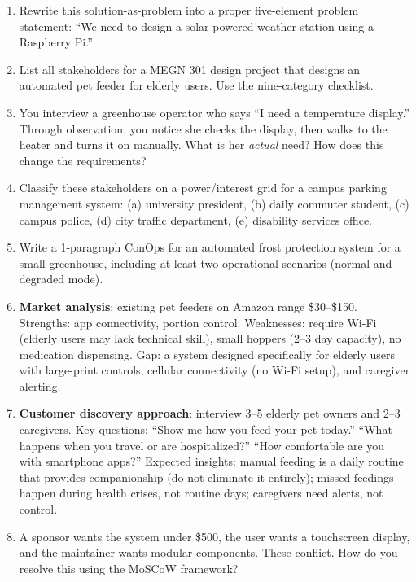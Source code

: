 \documentclass[11pt,letterpaper,twoside,openany]{book}
\begin{document}
\begin{enumerate}[leftmargin=1.5em]
\item Rewrite this solution-as-problem into a proper five-element problem statement: ``We need to design a solar-powered weather station using a Raspberry Pi.''
\item List all stakeholders for a MEGN 301 design project that designs an automated pet feeder for elderly users. Use the nine-category checklist.
\item You interview a greenhouse operator who says ``I need a temperature display.'' Through observation, you notice she checks the display, then walks to the heater and turns it on manually. What is her \emph{actual} need? How does this change the requirements?
\item Classify these stakeholders on a power/interest grid for a campus parking management system: (a) university president, (b) daily commuter student, (c) campus police, (d) city traffic department, (e) disability services office.
\item Write a 1-paragraph ConOps for an automated frost protection system for a small greenhouse, including at least two operational scenarios (normal and degraded mode).

\item \textbf{Market analysis}: existing pet feeders on Amazon range \$30--\$150. Strengths: app connectivity, portion control. Weaknesses: require Wi-Fi (elderly users may lack technical skill), small hoppers (2--3 day capacity), no medication dispensing. Gap: a system designed specifically for elderly users with large-print controls, cellular connectivity (no Wi-Fi setup), and caregiver alerting.

\item \textbf{Customer discovery approach}: interview 3--5 elderly pet owners and 2--3 caregivers. Key questions: ``Show me how you feed your pet today.'' ``What happens when you travel or are hospitalized?'' ``How comfortable are you with smartphone apps?'' Expected insights: manual feeding is a daily routine that provides companionship (do not eliminate it entirely); missed feedings happen during health crises, not routine days; caregivers need alerts, not control.

\item A sponsor wants the system under \$500, the user wants a touchscreen display, and the maintainer wants modular components. These conflict. How do you resolve this using the MoSCoW framework?
\end{enumerate}
\end{document}
